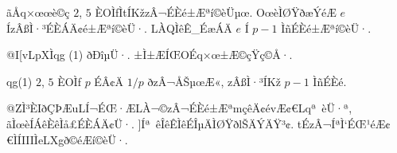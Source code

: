 \documentclass{jsarticle}
\theoremstyle{definition}
\begin{document}
ãÅq×œœè©ç $2$, $5$ ÈOÌfÌtÍKžzÂ¬ÉÈé±Æªí©èÜµœ.
OœèÌØŸðæ­ÝéÆ $e$ ÍzÂßÌ·³ÉÈÁÄ¢é±Æªí©èÜ·.
LÀQÌêÊ_ÉæÁÄ $e$ Í $p-1$ ÌñÉÈé±Æªí©èÜ·.
\begin{center}
\end{center}
@I[vLpXÌqg (1) ðÐîµÜ·. ±Ì±ÆÍŒOÉq×œ±Æ©çŸç©Å·.
\begin{itembox}[|]{qg(1)}
$2$, $5$ ÈOÌf $p$ ÉÂ¢Ä $1/p$ ðzÂ¬Å\ŠµœÆ«, zÂßÌ·³ÍKž $p-1$ ÌñÉÈé.
\end{itembox}
@ZÌ³ÈIðÇÞÆuLÍ¬ÉŒ·ÆLÀ¬©zÂ¬ÉÈé±ÆªmçêÄ¢évÆ¢€Lqª èÜ·ª, ãÌœèÍÁêÈêÌå£ÉÈÁÄ¢Ü·.
]Íª êÎêÊÌêÉÎµÄÌØŸðlŠÄÝÄ­Ÿ³¢.
tÉzÂ¬ÍªÌ`ÉŒ¹éÆ¢€ÌÍI\!I\!IÌeLXgð©éÆí©èÜ·.
\begin{center}
\end{center}
\end{document}

